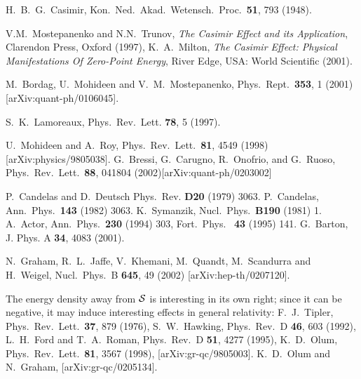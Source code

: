 \documentclass[a4paper,aps,amsfonts,prl,showpacs,nobibnotes,nofootinbib,%
tightenlines,twocolumn]{revtex4}
\begin{document}
\begin{thebibliography}{99}

 H.\ B.\ G.\ Casimir, 
Kon.\ Ned.\ Akad.\ Wetensch.\ Proc.\ {\bf 51}, 793 (1948).

V.M.\ Mostepanenko and N.N.\ Trunov, \textsl{The Casimir
Effect and its Application}, Clarendon Press, Oxford (1997),
K.\ A.\ Milton, \textsl{The Casimir Effect: Physical Manifestations Of
Zero-Point Energy}, River Edge, USA: World Scientific (2001).

M.\ Bordag, U.\ Mohideen and V.\ M.\ Mostepanenko,
Phys.\ Rept.\ \textbf{353}, 1 (2001)  [arXiv:quant-ph/0106045].

 S.\ K.\ Lamoreaux, Phys.\ Rev.\ Lett. {\bf 78}, 5 (1997).

U.\ Mohideen and A.\ Roy, Phys.\ Rev.\ Lett.\ {\bf 81}, 4549 (1998)
[arXiv:physics/9805038].
G.\ Bressi, G.\ Carugno, R.\ Onofrio, and G.\ Ruoso, Phys.\
Rev.\ Lett.\ {\bf 88}, 041804 (2002)[arXiv:quant-ph/0203002]

P.\ Candelas and D.\ Deutsch Phys.\ Rev.  {\bf D20}
 (1979) 3063.
P.\ Candelas, Ann.\ Phys.\ {\bf 143} (1982) 3063.
\bibitem{Symanzik}K.\ Symanzik,  Nucl.\  Phys.\ {\bf B190} (1981) 1.
\bibitem{Actor} A.~Actor, Ann.~Phys.~{\bf 230} (1994) 303, Fort.~Phys.~{\bf
	43} (1995) 141.
 G.\ Barton, J. Phys.  A {\bf 34}, 4083 (2001).

N.~Graham, R.~L.~Jaffe, V.~Khemani, M.~Quandt, M.~Scandurra and H.~Weigel,
Nucl.\ Phys.\ B {\bf 645}, 49 (2002)
[arXiv:hep-th/0207120].

The energy density away from ${\cal S}$
is interesting in its own right; since it can be negative, it may
induce interesting effects in general relativity: 
F.\ J.\ Tipler, Phys.\ Rev.\ Lett.\ {\bf 37}, 879 (1976),
S.\ W.\ Hawking, Phys.\ Rev.\ D {\bf 46}, 603 (1992),
L.\ H.\ Ford and T.\ A.\ Roman, Phys.\ Rev.\ D {\bf 51}, 4277 (1995),
K.\ D.\ Olum, Phys.\ Rev.\ Lett.\ {\bf 81}, 3567 (1998),
[arXiv:gr-qc/9805003].
K.\ D.\ Olum and N.\ Graham, [arXiv:gr-qc/0205134].


\end{thebibliography}
\end{document}
